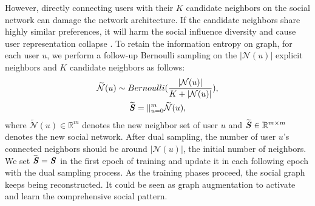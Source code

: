 \documentclass[letterpaper]{article} %
\begin{document}
However, directly connecting users with their $K$ candidate neighbors on the social network can damage the network architecture. If the candidate neighbors share highly similar preferences, it will harm the social influence diversity and cause user representation collapse \cite{collapse}. To retain the information entropy on graph, for each user $u$, we perform a follow-up Bernoulli sampling on the $|\mathcal{N}(u)|$ explicit neighbors and $K$ candidate neighbors as follows:
\begin{gather}
    \widetilde{\mathcal{N}}(u) \sim Bernoulli(\frac{|\mathcal{N}(u)|}{K+|\mathcal{N}(u)|}),\\
    \widetilde{\textbf{\textit{S}}} = \mathbin\Vert_{u=0}^{m}\widetilde{\mathcal{N}}(u),
\end{gather}
where $\widetilde{\mathcal{N}}(u) \in \mathbb{R}^{m}$ denotes the new neighbor set of user $u$ and  $\widetilde{\textbf{\textit{S}}} \in \mathbb{R}^{m\times m}$ denotes the new social network. After dual sampling, the number of user $u$'s connected neighbors should be around $|\mathcal{N}(u)|$, the initial number of neighbors. We set $\widetilde{\textbf{\textit{S}}}=\textbf{\textit{S}}$ in the first epoch of training and update it in each following epoch with the dual sampling process. As the training phases proceed, the social graph keeps being reconstructed. It could be seen as graph augmentation to activate and learn the comprehensive social pattern. 
\end{document}
